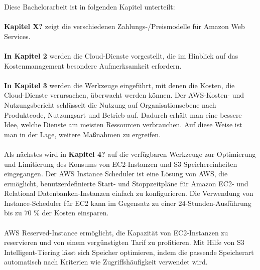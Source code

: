 Diese Bachelorarbeit ist in folgenden Kapitel unterteilt:\\\\
\textbf{Kapitel X?} 
zeigt die verschiedenen Zahlungs-/Preismodelle für Amazon Web Services. 
\\\\
\textbf{In Kapitel 2} werden die Cloud-Dienste vorgestellt, die im Hinblick auf das Kostenmanagement besondere Aufmerksamkeit erfordern.
\\\\
\textbf{In Kapitel 3} werden die Werkzeuge eingeführt, mit denen die Kosten, die Cloud-Dienste verursachen, überwacht werden können. Der AWS-Kosten- und Nutzungsbericht schlüsselt die Nutzung auf Organisationsebene nach Produktcode, Nutzungsart und Betrieb auf. Dadurch erhält man eine bessere Idee, welche Dienste am meisten Ressourcen verbrauchen. Auf diese Weise ist man in der Lage, weitere Maßnahmen zu ergreifen.
\\\\
Als nächstes wird in \textbf{Kapitel 4?} auf die verfügbaren Werkzeuge zur Optimierung und Limitierung des Konsums von EC2-Instanzen und S3 Speichereinheiten eingegangen. Der AWS Instance Scheduler ist eine Lösung von AWS, die ermöglicht, benutzerdefinierte Start- und Stoppzeitpläne für Amazon EC2- und Relational Datenbanken-Instanzen einfach zu konfigurieren. Die Verwendung von Instance-Scheduler für EC2 kann im Gegensatz zu einer 24-Stunden-Ausführung bis zu 70 \% der Kosten einsparen.
\\\\
AWS Reserved-Instance ermöglicht, die Kapazität von EC2-Instanzen zu reservieren und von einem vergünstigten Tarif zu profitieren. Mit Hilfe von S3 Intelligent-Tiering lässt sich Speicher optimieren, indem die passende Speicherart automatisch nach Kriterien wie Zugriffshäufigkeit verwendet wird.
\\\\
 
